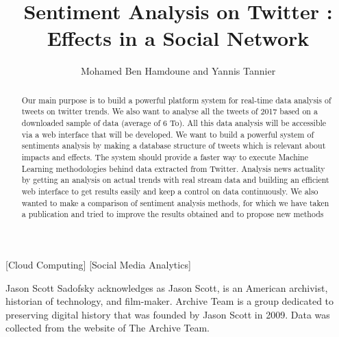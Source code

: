 \documentclass{acmtog} %
\begin{document}

\title{Sentiment Analysis on Twitter : Effects in a Social Network} %

\author{Mohamed Ben Hamdoune {\upshape and} Yannis Tannier
}

[Cloud Computing]
[Social Media Analytics]




\maketitle

\begin{bottomstuff}
Jason Scott Sadofsky acknowledges as Jason Scott, is an American archivist, historian of technology, and film-maker. Archive Team is a group dedicated to preserving digital history that was founded by Jason Scott in 2009. Data was collected from the website of The Archive Team.
\end{bottomstuff}


\begin{abstract}

Our main purpose is to build a powerful platform system for real-time data analysis of tweets on twitter trends. We also want to analyse all the tweets of 2017 based on a downloaded sample of data (average of 6 To). All this data analysis will be accessible via a web interface that will be developed. We want to build a powerful system of sentiments analysis by making a database structure of tweets which is relevant about impacts and effects. The system should provide a faster way to execute Machine Learning methodologies behind data extracted from Twitter. Analysis news actuality by getting an analysis on actual trends with real stream data and building an efficient web interface to get results easily and keep a control on data continuously.
We also wanted to make a comparison of sentiment analysis methods, for which we have taken a publication and tried to improve the results obtained and to propose new methods
\end{abstract}
\end{document}

